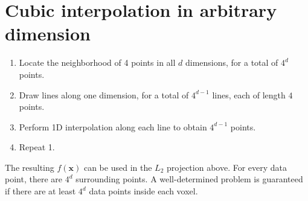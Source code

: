 \documentclass[11pt]{article}
\begin{document}

\section{Cubic interpolation in arbitrary dimension}


\begin{enumerate}
\item Locate the neighborhood of 4 points in all $d$ dimensions, for a total of $4^d$ points.
\item Draw lines along one dimension, for a total of $4^{d-1}$ lines, each of length $4$ points.
\item Perform 1D interpolation along each line to obtain $4^{d-1}$ points.
\item Repeat 1.
\end{enumerate}

The resulting $f(\boldsymbol{x})$ can be used in the $L_2$ projection above. For every data point, there are $4^d$ surrounding points. A well-determined problem is guaranteed if there are at least $4^d$ data points inside each voxel.
\end{document}
